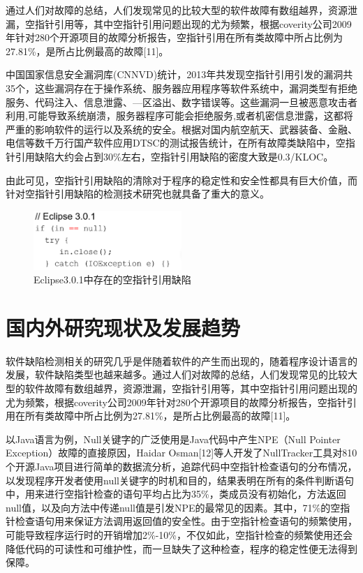 通过人们对故障的总结，人们发现常见的比较大型的软件故障有数组越界，资源泄漏，空指针引用等，其中空指针引用问题出现的尤为频繁，根据coverity公司2009年针对280个开源项目的故障分析报告，空指针引用在所有类故障中所占比例为27.81\%，是所占比例最高的故障[11]。


中国国家信息安全漏洞库(CNNVD)统计，2013年共发现空指针引用引发的漏洞共35个，这些漏洞存在于操作系统、服务器应用程序等软件系统中，漏洞类型有拒绝服务、代码注入、信息泄露、—区溢出、数字错误等。这些漏洞一旦被恶意攻击者利用,可能导致系统崩溃，服务器程序可能会拒绝服务,或者机密信息泄露，这都将严重的影响软件的运行以及系统的安全。根据对国内航空航天、武器装备、金融、电信等数千万行国产软件应用DTSC的测试报告统计，在所有故障类缺陷中，空指针引用缺陷大约会占到30\%左右，空指针引用缺陷的密度大致是0.3/KLOC。

由此可见，空指针引用缺陷的清除对于程序的稳定性和安全性都具有巨大价值，而针对空指针引用缺陷的检测技术研究也就具备了重大的意义。
 \begin{figure}
 \centering
 \includegraphics[width=0.50\textwidth]{figures/NullPointer1-1}
 \caption{Eclipse3.0.1中存在的空指针引用缺陷}\label{fig:figure1-1}
\end{figure}

\section{国内外研究现状及发展趋势}

软件缺陷检测相关的研究几乎是伴随着软件的产生而出现的，随着程序设计语言的发展，软件缺陷类型也越来越多。通过人们对故障的总结，人们发现常见的比较大型的软件故障有数组越界，资源泄漏，空指针引用等，其中空指针引用问题出现的尤为频繁，根据coverity公司2009年针对280个开源项目的故障分析报告，空指针引用在所有类故障中所占比例为27.81\%，是所占比例最高的故障[11]。

以Java语言为例，Null关键字的广泛使用是Java代码中产生NPE（Null Pointer Exception）故障的直接原因，Haidar Osman[12]等人开发了NullTracker工具对810个开源Java项目进行简单的数据流分析，追踪代码中空指针检查语句的分布情况，以发现程序开发者使用null关键字的时机和目的，结果表明在所有的条件判断语句中，用来进行空指针检查的语句平均占比为35\%，类成员没有初始化，方法返回null值，以及向方法中传递null值是引发NPE的最常见的因素。其中，71\%的空指针检查语句用来保证方法调用返回值的安全性。由于空指针检查语句的频繁使用，可能导致程序运行时的开销增加2\%-10\%，不仅如此，空指针检查的频繁使用还会降低代码的可读性和可维护性，而一旦缺失了这种检查，程序的稳定性便无法得到保障。


